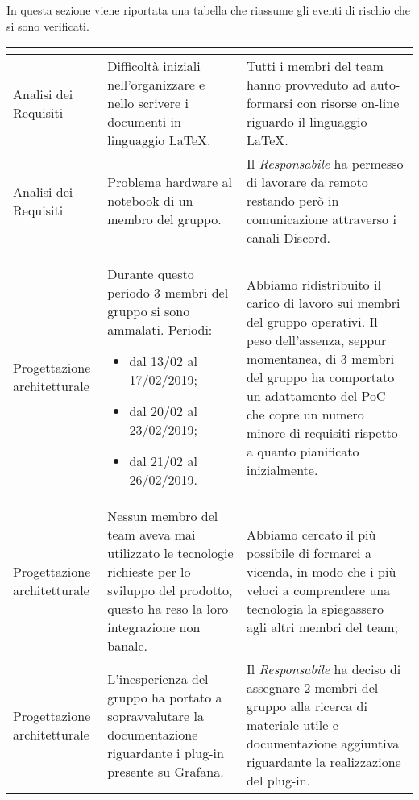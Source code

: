 In questa sezione viene riportata una tabella che riassume gli eventi di rischio che si sono verificati.
\vspace{1cm}
\renewcommand{\arraystretch}{1.5}
\begin{longtable}{| m{7em} | m{15em} | m{16em} |}
\hline
\rowcolor{title_row}
\textbf{\color{title_text}{Periodo}}  & \textbf{\color{title_text}{Evento}} & \textbf{\color{title_text}{Reazione}} \\
\endhead
\hline
Analisi dei Requisiti & Difficoltà iniziali nell'organizzare e nello scrivere i documenti in linguaggio \LaTeX. & Tutti i membri del team hanno provveduto ad auto-formarsi con risorse on-line riguardo il linguaggio \LaTeX. \\
\hline

Analisi dei Requisiti & Problema hardware al notebook di un membro del gruppo. &  Il \emph{Responsabile} ha permesso di lavorare da remoto restando però in comunicazione attraverso i canali Discord.\\
\hline

Progettazione architetturale & Durante questo periodo 3 membri del gruppo si sono ammalati. Periodi:\begin{itemize}
    \item dal 13/02 al 17/02/2019;
    \item dal 20/02 al 23/02/2019;
    \item dal 21/02 al 26/02/2019.
\end{itemize} & Abbiamo ridistribuito il carico di lavoro sui membri del gruppo operativi.
Il peso dell'assenza, seppur momentanea, di 3 membri del gruppo ha comportato un adattamento del PoC che copre un numero minore di requisiti rispetto a quanto pianificato inizialmente. \\
\hline

Progettazione architetturale & Nessun membro del team aveva mai utilizzato le tecnologie richieste per lo sviluppo del prodotto, questo ha reso la loro integrazione non banale. & Abbiamo cercato il più possibile di formarci a vicenda, in modo che i più veloci a comprendere una tecnologia la spiegassero agli altri membri del team; \\
\hline

Progettazione architetturale & L'inesperienza del gruppo ha portato a sopravvalutare la documentazione riguardante i plug-in presente su Grafana. & Il \emph{Responsabile} ha deciso di assegnare 2 membri del gruppo alla ricerca di materiale utile e documentazione aggiuntiva riguardante la realizzazione del plug-in. \\
\hline


\end{longtable}
